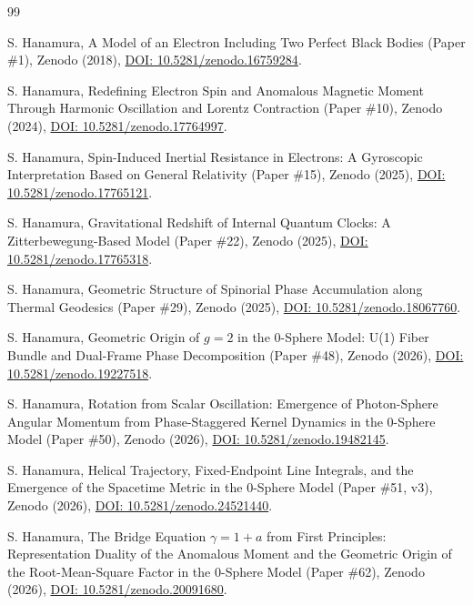 \documentclass[%
 reprint, amsmath,amssymb, aps, prb, ]{revtex4-2}
\numberwithin{equation}{section}
\begin{document}
\begin{thebibliography}{99}

 S. Hanamura, A Model of an Electron Including Two Perfect Black Bodies (Paper \#1), Zenodo (2018), \href{https://doi.org/10.5281/zenodo.16759284}{DOI: 10.5281/zenodo.16759284}.

 S. Hanamura, Redefining Electron Spin and Anomalous Magnetic Moment Through Harmonic Oscillation and Lorentz Contraction (Paper \#10), Zenodo (2024), \href{https://doi.org/10.5281/zenodo.17764997}{DOI: 10.5281/zenodo.17764997}.

 S. Hanamura, Spin-Induced Inertial Resistance in Electrons: A Gyroscopic Interpretation Based on General Relativity (Paper \#15), Zenodo (2025), \href{https://doi.org/10.5281/zenodo.17765121}{DOI: 10.5281/zenodo.17765121}.

 S. Hanamura, Gravitational Redshift of Internal Quantum Clocks: A Zitterbewegung-Based Model (Paper \#22), Zenodo (2025), \href{https://doi.org/10.5281/zenodo.17765318}{DOI: 10.5281/zenodo.17765318}.

 S. Hanamura, Geometric Structure of Spinorial Phase Accumulation along Thermal Geodesics (Paper \#29), Zenodo (2025), \href{https://doi.org/10.5281/zenodo.18067760}{DOI: 10.5281/zenodo.18067760}.

 S. Hanamura, Geometric Origin of $g = 2$ in the 0-Sphere Model: U(1) Fiber Bundle and Dual-Frame Phase Decomposition (Paper \#48), Zenodo (2026), \href{https://doi.org/10.5281/zenodo.19227518}{DOI: 10.5281/zenodo.19227518}.

 S. Hanamura, Rotation from Scalar Oscillation: Emergence of Photon-Sphere Angular Momentum from Phase-Staggered Kernel Dynamics in the 0-Sphere Model (Paper \#50), Zenodo (2026), \href{https://doi.org/10.5281/zenodo.19482145}{DOI: 10.5281/zenodo.19482145}.

 S. Hanamura, Helical Trajectory, Fixed-Endpoint Line Integrals, and the Emergence of the Spacetime Metric in the 0-Sphere Model (Paper \#51, v3), Zenodo (2026), \href{https://doi.org/10.5281/zenodo.24521440}{DOI: 10.5281/zenodo.24521440}.

 S. Hanamura, The Bridge Equation $\gamma = 1 + a$ from First Principles: Representation Duality of the Anomalous Moment and the Geometric Origin of the Root-Mean-Square Factor in the 0-Sphere Model (Paper \#62), Zenodo (2026), \href{https://doi.org/10.5281/zenodo.20091680}{DOI: 10.5281/zenodo.20091680}.


\end{thebibliography}
\end{document}
